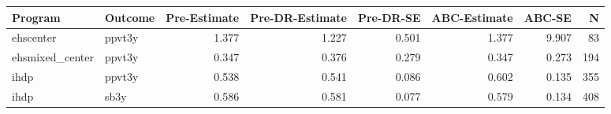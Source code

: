 \begin{table}[ht]
\centering
\begin{tabular}{llrrrrrr}
  \hline
Program & Outcome & Pre-Estimate & Pre-DR-Estimate & Pre-DR-SE & ABC-Estimate & ABC-SE & N \\ 
  \hline
ehscenter & ppvt3y & 1.377 & 1.227 & 0.501 & 1.377 & 9.907 & 83 \\ 
  ehsmixed\_center & ppvt3y & 0.347 & 0.376 & 0.279 & 0.347 & 0.273 & 194 \\ 
  ihdp & ppvt3y & 0.538 & 0.541 & 0.086 & 0.602 & 0.135 & 355 \\ 
  ihdp & sb3y & 0.586 & 0.581 & 0.077 & 0.579 & 0.134 & 408 \\ 
   \hline
\end{tabular}
\end{table}
